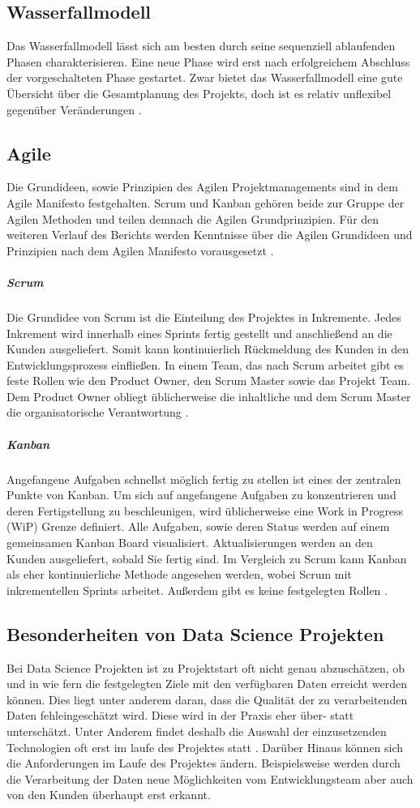 \documentclass[twocolumn,10pt]{asme2ej}
\begin{document}
\subsection{Wasserfallmodell}
Das Wasserfallmodell lässt sich am besten durch seine sequenziell ablaufenden Phasen charakterisieren. Eine neue Phase wird erst nach erfolgreichem Abschluss der vorgeschalteten Phase gestartet. Zwar bietet das Wasserfallmodell eine gute Übersicht über die Gesamtplanung des Projekts, doch ist es relativ unflexibel gegenüber Veränderungen \cite{Wasserfall}.

\subsection{Agile}
Die Grundideen, sowie Prinzipien des Agilen Projektmanagements sind in dem Agile Manifesto \cite{beck2001agile} festgehalten. Scrum und Kanban gehören beide zur Gruppe der Agilen Methoden und teilen demnach die Agilen Grundprinzipien. Für den weiteren Verlauf des Berichts werden Kenntnisse über die Agilen Grundideen und Prinzipien nach dem Agilen Manifesto vorausgesetzt \cite{beck2001agile}.

\subparagraph{Scrum}
Die Grundidee von Scrum ist die Einteilung des Projektes in Inkremente. Jedes Inkrement wird innerhalb eines Sprints fertig gestellt und anschließend an die Kunden ausgeliefert. Somit kann kontinuierlich Rückmeldung des Kunden in den Entwicklungsprozess einfließen. In einem Team, das nach Scrum arbeitet gibt es feste Rollen wie den Product Owner, den Scrum Master sowie das Projekt Team. Dem Product Owner obliegt üblicherweise die inhaltliche und dem Scrum Master die organisatorische Verantwortung \cite{scrum}.

\subparagraph{Kanban}
Angefangene Aufgaben schnellst möglich fertig zu stellen ist eines der zentralen Punkte von Kanban. Um sich auf angefangene Aufgaben zu konzentrieren und deren Fertigstellung zu beschleunigen, wird üblicherweise eine Work in Progress (WiP) Grenze definiert. Alle Aufgaben, sowie deren Status werden auf einem gemeinsamen Kanban Board visualisiert. Aktualisierungen werden an den Kunden ausgeliefert, sobald Sie fertig sind. Im Vergleich zu Scrum kann Kanban als eher kontinuierliche Methode angesehen werden, wobei Scrum mit inkrementellen Sprints arbeitet. Außerdem gibt es keine festgelegten Rollen \cite{kanban}.

\subsection{Besonderheiten von Data Science Projekten}
Bei Data Science Projekten ist zu Projektstart oft nicht genau abzuschätzen, ob und in wie fern die festgelegten Ziele mit den verfügbaren Daten erreicht werden können. Dies liegt unter anderem daran, dass die Qualität der zu verarbeitenden Daten fehleingeschätzt wird. Diese wird in der Praxis eher über- statt unterschätzt. Unter Anderem findet deshalb die Auswahl der einzusetzenden Technologien oft erst im laufe des Projektes statt \cite{agile_pm}. Darüber Hinaus können sich die Anforderungen im Laufe des Projektes ändern. Beispielsweise werden durch die Verarbeitung der Daten neue Möglichkeiten vom Entwicklungsteam aber auch von den Kunden überhaupt erst erkannt. 
\end{document}
